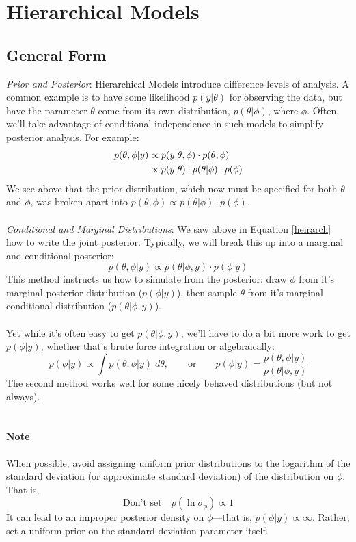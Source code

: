 \documentclass[12pt]{article}
\begin{document}
\newpage 
\section{Hierarchical Models}

\subsection{General Form}
{\sl Prior and Posterior}: 
Hierarchical Models introduce difference
levels of analysis.  A common example is to have some likelihood
$p(y|\theta)$ for observing the data, but have the parameter $\theta$
come from its own distribution, $p(\theta |\phi)$, where $\phi$.  
Often, we'll take advantage of 
conditional independence in such models to simplify 
posterior analysis. For example:
\begin{align}
   \label{heirarch}
   p(\theta,\phi|y) &\propto p(y| \theta, \phi)\cdot p(\theta, \phi) 
      \notag\\
   &\propto p(y|\theta) \cdot p(\theta|\phi)\cdot p(\phi)
\end{align}
We see above that the prior distribution, which now must be specified
for both $\theta$ and $\phi$, was broken apart into
$p(\theta, \phi) \propto p(\theta|\phi) \cdot p(\phi)$.
\\
\\
{\sl Conditional and Marginal Distributions}: We saw above
in Equation \ref{heirarch} how to write the joint posterior.
Typically, we will break this up into a marginal and conditional
posterior:
\[ p(\theta, \phi|y) \propto p(\theta | \phi, y)\cdot p(\phi | y) \]
This method instructs us how to simulate from the posterior: 
draw $\phi$ from it's marginal posterior distribution ($p(\phi|y)$), 
then sample $\theta$ from it's marginal conditional distribution
($p(\theta | \phi, y)$).
\\
\\
Yet while it's often easy to get $p(\theta | \phi, y)$, we'll have to 
do a bit more work to get $p(\phi |y)$, whether that's brute force
integration or algebraically:
\[ p(\phi|y) \propto \int p(\theta, \phi | y) \; d\theta, \qquad
   \text{or} \qquad p(\phi | y) = \frac{p(\theta, \phi | y)}{
   p(\theta | \phi, y)}\]
The second method works well for some nicely behaved distributions (but
not always).
\\
\\
\paragraph{Note} When possible, avoid assigning uniform prior
distributions
to the logarithm of the standard deviation (or approximate standard
deviation) of the distribution on
$\phi$. That is, 
\[ \text{Don't set} \quad p(\ln \sigma_\phi) \propto 1 \]
It can lead to an improper posterior density on $\phi$---that is,  
$p(\phi | y) \propto \infty$. Rather, set a uniform prior on the
standard deviation parameter itself.
\end{document}
